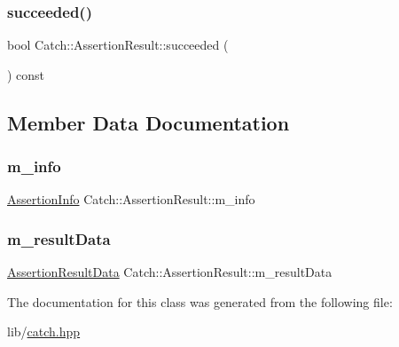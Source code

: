 \subsubsection{\texorpdfstring{succeeded()}{succeeded()}}
{\footnotesize\ttfamily bool Catch\+::\+Assertion\+Result\+::succeeded (\begin{DoxyParamCaption}{ }\end{DoxyParamCaption}) const}



\subsection{Member Data Documentation}
\hypertarget{class_catch_1_1_assertion_result_a3e7236f73a51d6fc8bb9dfdefcee7772}{}\label{class_catch_1_1_assertion_result_a3e7236f73a51d6fc8bb9dfdefcee7772} 
\subsubsection{\texorpdfstring{m\+\_\+info}{m\_info}}
{\footnotesize\ttfamily \hyperlink{struct_catch_1_1_assertion_info}{Assertion\+Info} Catch\+::\+Assertion\+Result\+::m\+\_\+info\hspace{0.3cm}{\ttfamily [protected]}}

\hypertarget{class_catch_1_1_assertion_result_add3455b8bbedb0d643e18da67c66b4f7}{}\label{class_catch_1_1_assertion_result_add3455b8bbedb0d643e18da67c66b4f7} 
\subsubsection{\texorpdfstring{m\+\_\+result\+Data}{m\_resultData}}
{\footnotesize\ttfamily \hyperlink{struct_catch_1_1_assertion_result_data}{Assertion\+Result\+Data} Catch\+::\+Assertion\+Result\+::m\+\_\+result\+Data\hspace{0.3cm}{\ttfamily [protected]}}



The documentation for this class was generated from the following file\+:\begin{DoxyCompactItemize}
\item 
lib/\hyperlink{catch_8hpp}{catch.\+hpp}\end{DoxyCompactItemize}
